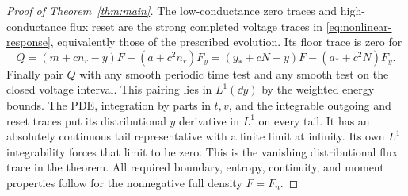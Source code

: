 \begin{proof}[Proof of Theorem~\ref{thm:main}]
The low-conductance zero traces and high-conductance flux reset
are the strong completed voltage traces in
\eqref{eq:nonlinear-response}, equivalently those of the
prescribed evolution. Its floor trace is zero for
\[
 Q=(m+cn_r-y)F-(a+c^2n_r)F_y
      =(y_*+cN-y)F-(a_*+c^2N)F_y.
\]
Finally pair $Q$ with any smooth periodic time test and any
smooth test on the closed voltage interval. This pairing lies
in $L^1(\dd y)$ by the weighted energy bounds. The PDE,
integration by parts in $t,v$, and the integrable outgoing and
reset traces put its distributional $y$ derivative in $L^1$
on every tail. It has an absolutely continuous tail
representative with a finite limit at infinity. Its own
$L^1$ integrability forces that limit to be zero. This is the
vanishing distributional flux trace in the theorem.
All required boundary, entropy, continuity, and moment
properties follow for the nonnegative full density $F=F_n$.
\end{proof}
